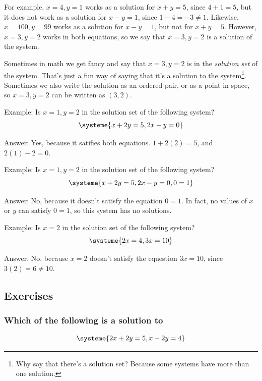 \documentclass[a4paper,twoside,12pt]{memoir}  %
\begin{document}
For example, $x=4, y=1$ works as a solution for $x+y=5$, since $4+1=5$, but it does not work as a solution for $x-y=1$, since $1-4 = -3 \neq 1$. Likewise, $x=100, y=99$ works as a solution for $x-y=1$, but not for $x+y=5$. However, $x=3,y=2$ works in both equations, so we say that $x=3, y=2$ is a solution of the system.

Sometimes in math we get fancy and say that $x=3, y=2$ is in the \textit{solution set} of the system.
That's just a fun way of saying that it's a solution to the system\footnote{Why say that there's a solution set? Because some systems have more than one solution.}.
Sometimes we also write the solution as an ordered pair, or as a point in space, so $x=3, y =2$ can be written as $(3,2)$.

Example:
Is $x=1, y =2$ in the solution set of the following system?
\begin{equation*}
  \systeme{
    x + 2y = 5,
    2x - y = 0
  }
\end{equation*}

Answer: Yes, because it satifies both equations. $1 + 2(2) = 5$, and $2(1) - 2 = 0$.

Example:
Is $x = 1, y = 2$ in the solution set of the following system?
\begin{equation*}
  \systeme{
    x + 2y = 5,
    2x - y = 0,
         0 = 1
  }
\end{equation*}

Answer: No, because it doesn't satisfy the equation $0=1$. In fact, no values of $x$ or $y$ can satisfy $0=1$, so this system has no solutions.

Example:
Is $x = 2$ in the solution set of the following system?
\begin{equation*}
  \systeme{
    2x = 4,
    3x = 10
  }
\end{equation*}

Answer. No, because $x=2$ doesn't satisfy the equestion $3x=10$, since $3(2) = 6 \neq 10$.

\subsection{Exercises}
\subsubsection{Which of the following is a solution to}
\begin{equation*}
  \systeme{
    2x + 2y = 5,
    x  - 2y = 4
  }
\end{equation*}
\end{document}
